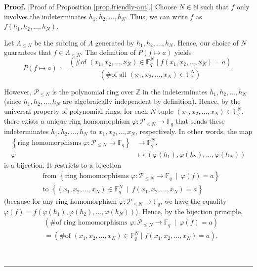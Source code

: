 \documentclass[numbers=enddot,12pt,final,onecolumn,notitlepage]{scrartcl}%
\theoremstyle{definition}
\newenvironment{proof}[1][Proof]{\noindent\textbf{#1.} }{\ \rule{0.5em}{0.5em}}
\renewcommand{\leq}{\leqslant}
\theoremstyle{plainsl}
\begin{document}
\begin{proof}
[Proof of Proposition \ref{prop.friendly-aut}.] Choose $N\in\mathbb{N}$ such
that $f$ only involves the indeterminates $h_{1},h_{2},\ldots,h_{N}$. Thus, we
can write $f$ as $f\left(  h_{1},h_{2},\ldots,h_{N}\right)  $.

Let $\Lambda_{\leq N}$ be the subring of $\Lambda$ generated by $h_{1}%
,h_{2},\ldots,h_{N}$. Hence, our choice of $N$ guarantees that $f\in
\Lambda_{\leq N}$. The definition of $P\left(  f\mapsto a\right)  $ yields%
\begin{equation}
P\left(  f\mapsto a\right)  :=\dfrac{\left(  \text{\# of }\left(  x_{1}%
,x_{2},\ldots,x_{N}\right)  \in\mathbb{F}_{q}^{N}\mid f\left(  x_{1}%
,x_{2},\ldots,x_{N}\right)  =a\right)  }{\left(  \text{\# of all }\left(
x_{1},x_{2},\ldots,x_{N}\right)  \in\mathbb{F}_{q}^{N}\right)  }%
.\label{pf.prop.friendly-aut.P1}%
\end{equation}


However, $\mathcal{P}_{\leq N}$ is the polynomial ring over $\mathbb{Z}$ in
the indeterminates $h_{1},h_{2},\ldots,h_{N}$ (since $h_{1},h_{2},\ldots
,h_{N}$ are algebraically independent by definition). Hence, by the universal
property of polynomial rings, for each $N$-tuple $\left(  x_{1},x_{2}%
,\ldots,x_{N}\right)  \in\mathbb{F}_{q}^{N}$, there exists a unique ring
homomorphism $\varphi:\mathcal{P}_{\leq N}\rightarrow\mathbb{F}_{q}$ that
sends these indeterminates $h_{1},h_{2},\ldots,h_{N}$ to $x_{1},x_{2}%
,\ldots,x_{N}$, respectively. In other words, the map%
\begin{align*}
\left\{  \text{ring homomorphisms }\varphi:\mathcal{P}_{\leq N}\rightarrow
\mathbb{F}_{q}\right\}    & \rightarrow\mathbb{F}_{q}^{N},\\
\varphi & \mapsto\left(  \varphi\left(  h_{1}\right)  ,\varphi\left(
h_{2}\right)  ,\ldots,\varphi\left(  h_{N}\right)  \right)
\end{align*}
is a bijection. It restricts to a bijection
\begin{align*}
& \text{from }\left\{  \text{ring homomorphisms }\varphi:\mathcal{P}_{\leq
N}\rightarrow\mathbb{F}_{q}\ \mid\ \varphi\left(  f\right)  =a\right\}  \\
& \text{to }\left\{  \left(  x_{1},x_{2},\ldots,x_{N}\right)  \in
\mathbb{F}_{q}^{N}\ \mid\ f\left(  x_{1},x_{2},\ldots,x_{N}\right)
=a\right\}
\end{align*}
(because for any ring homomorphism $\varphi:\mathcal{P}_{\leq N}%
\rightarrow\mathbb{F}_{q}$, we have the equality
$\varphi\left(  f\right)  =f\left(
\varphi\left(  h_{1}\right)  ,\varphi\left(  h_{2}\right)  ,\ldots
,\varphi\left(  h_{N}\right)  \right)  $). Hence, by the bijection principle,%
\begin{align}
& \left(  \text{\# of ring homomorphisms }\varphi:\mathcal{P}_{\leq
N}\rightarrow\mathbb{F}_{q}\ \mid\ \varphi\left(  f\right)  =a\right)
\nonumber\\
& =\left(  \text{\# of }\left(  x_{1},x_{2},\ldots,x_{N}\right)  \in
\mathbb{F}_{q}^{N}\mid f\left(  x_{1},x_{2},\ldots,x_{N}\right)  =a\right)
.\label{pf.prop.friendly-aut.1}%
\end{align}



\end{proof}
\end{document}
